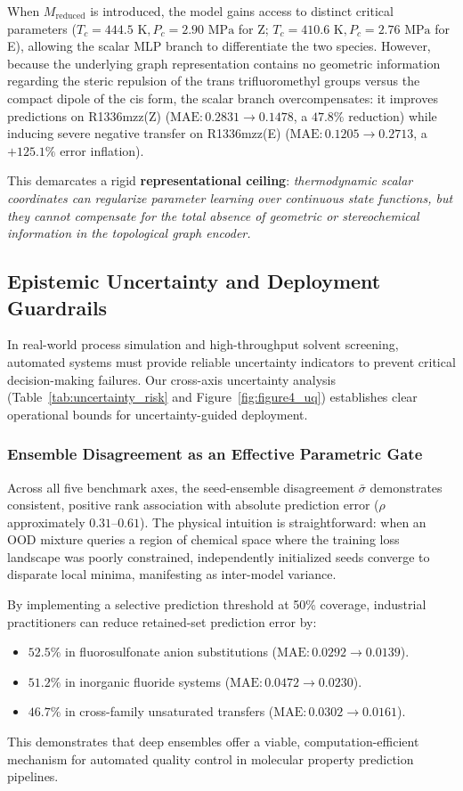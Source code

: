 When $M_{\mathrm{reduced}}$ is introduced, the model gains access to distinct critical parameters ($T_c = 444.5\text{ K}, P_c = 2.90\text{ MPa}$ for Z; $T_c = 410.6\text{ K}, P_c = 2.76\text{ MPa}$ for E), allowing the scalar MLP branch to differentiate the two species. However, because the underlying graph representation contains no geometric information regarding the steric repulsion of the trans trifluoromethyl groups versus the compact dipole of the cis form, the scalar branch overcompensates: it improves predictions on R1336mzz(Z) ($\text{MAE}: 0.2831 \to 0.1478$, a $47.8\%$ reduction) while inducing severe negative transfer on R1336mzz(E) ($\text{MAE}: 0.1205 \to 0.2713$, a $+125.1\%$ error inflation).

This demarcates a rigid \textbf{representational ceiling}: \textit{thermodynamic scalar coordinates can regularize parameter learning over continuous state functions, but they cannot compensate for the total absence of geometric or stereochemical information in the topological graph encoder.}

\subsection{Epistemic Uncertainty and Deployment Guardrails}
\label{subsec:uncertainty_guardrails}

In real-world process simulation and high-throughput solvent screening, automated systems must provide reliable uncertainty indicators to prevent critical decision-making failures. Our cross-axis uncertainty analysis (Table~\ref{tab:uncertainty_risk} and Figure~\ref{fig:figure4_uq}) establishes clear operational bounds for uncertainty-guided deployment.

\subsubsection{Ensemble Disagreement as an Effective Parametric Gate}
Across all five benchmark axes, the seed-ensemble disagreement $\bar{\sigma}$ demonstrates consistent, positive rank association with absolute prediction error ($\rho$ approximately $0.31\text{--}0.61$). The physical intuition is straightforward: when an OOD mixture queries a region of chemical space where the training loss landscape was poorly constrained, independently initialized seeds converge to disparate local minima, manifesting as inter-model variance.

By implementing a selective prediction threshold at 50\% coverage, industrial practitioners can reduce retained-set prediction error by:
\begin{itemize}
    \item \textbf{$52.5\%$} in fluorosulfonate anion substitutions ($\text{MAE}: 0.0292 \to 0.0139$).
    \item \textbf{$51.2\%$} in inorganic fluoride systems ($\text{MAE}: 0.0472 \to 0.0230$).
    \item \textbf{$46.7\%$} in cross-family unsaturated transfers ($\text{MAE}: 0.0302 \to 0.0161$).
\end{itemize}
This demonstrates that deep ensembles offer a viable, computation-efficient mechanism for automated quality control in molecular property prediction pipelines.

